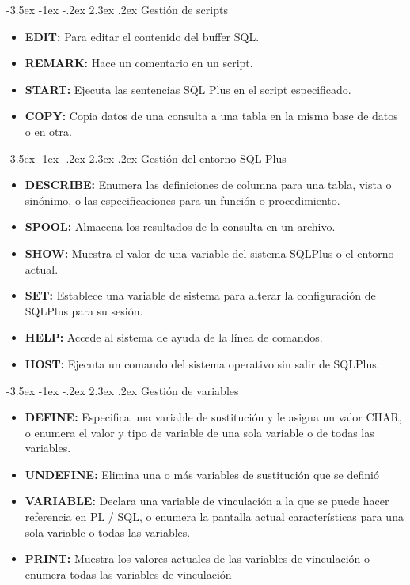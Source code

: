 \documentclass[11pt]{report}
\makeatletter
\renewcommand\chapter{\@startsection{chapter}{0}{\z@}%
    {-3.5ex \@plus -1ex \@minus -.2ex}%
    {2.3ex \@plus.2ex}%
    {\normalfont\Large\bfseries}}
\makeatother
\begin{document}
\chapter{Gestión de scripts}
\begin{itemize}
  \item \textbf{EDIT:} Para editar el contenido del buffer SQL.
  \item \textbf{REMARK:} Hace un comentario en un script.
  \item \textbf{START:} Ejecuta las sentencias SQL Plus en el script especificado.
  \item \textbf{COPY:} Copia datos de una consulta a una tabla en la misma base de datos o en otra.
\end{itemize}

\chapter{Gestión del entorno SQL Plus}
\begin{itemize}
  \item \textbf{DESCRIBE:} Enumera las definiciones de columna para una tabla, vista o sinónimo, o las especificaciones para un función o procedimiento.
  \item \textbf{SPOOL:} Almacena los resultados de la consulta en un archivo.
  \item \textbf{SHOW:} Muestra el valor de una variable del sistema SQLPlus o el entorno actual.
  \item \textbf{SET:} Establece una variable de sistema para alterar la configuración de SQLPlus para su sesión.
  \item \textbf{HELP:} Accede al sistema de ayuda de la línea de comandos.
  \item \textbf{HOST:} Ejecuta un comando del sistema operativo sin salir de SQLPlus.
\end{itemize}

\chapter{Gestión de variables}
\begin{itemize}
  \item \textbf{DEFINE:} Especifica una variable de sustitución y le asigna un valor CHAR, o enumera el valor y tipo de variable de una sola variable o de todas las variables.
  \item \textbf{UNDEFINE:} Elimina una o más variables de sustitución que se definió
  \item \textbf{VARIABLE:} Declara una variable de vinculación a la que se puede hacer referencia en PL / SQL, o enumera la pantalla actual características para una sola variable o todas las variables.
  \item \textbf{PRINT:} Muestra los valores actuales de las variables de vinculación o enumera todas las variables de vinculación
\end{itemize}
\end{document}
